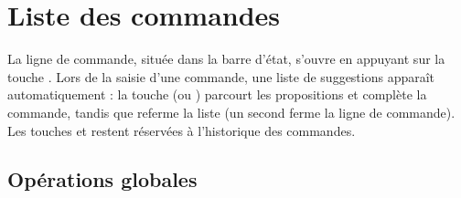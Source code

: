 \documentclass[letterpaper,10pt,french]{sphinxmanual}
\begin{document}
\sphinxstepscope


\section{Liste des commandes}
\label{\detokenize{cmd_mode:liste-des-commandes}}\label{\detokenize{cmd_mode:cmd-mode}}\label{\detokenize{cmd_mode::doc}}
\sphinxAtStartPar
La ligne de commande, située dans la barre d’état, s’ouvre en appuyant sur la
touche . Lors de la saisie d’une commande, une liste de suggestions
apparaît automatiquement : la touche  (ou ) parcourt les
propositions et complète la commande, tandis que  referme la liste (un
second  ferme la ligne de commande). Les touches  et  restent
réservées à l’historique des commandes.


\subsection{Opérations globales}
\label{\detokenize{cmd_mode:operations-globales}}\label{\detokenize{cmd_mode:cmd-global}}
\end{document}
